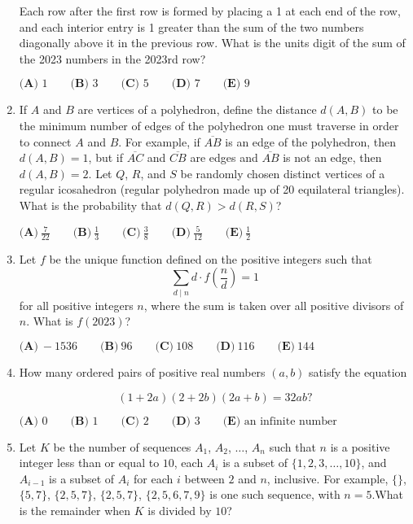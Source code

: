 \documentclass{article}
\begin{document}
\begin{enumerate}[label=\arabic*., itemsep=0.5em]
Each row after the first row is formed by placing a 1 at each end of the row, and each interior entry is 1 greater than the sum of the two numbers diagonally above it in the previous row. What is the units digit of the sum of the 2023 numbers in the 2023rd row?

\(\textbf{(A) }1\qquad\textbf{(B) }3\qquad\textbf{(C) }5\qquad\textbf{(D) }7\qquad\textbf{(E) }9\)\par \vspace{0.5em}\item If \(A\) and \(B\) are vertices of a polyhedron, define the distance \(d(A, B)\) to be the minimum number of edges of the polyhedron one must traverse in order to connect \(A\) and \(B\). For example, if \(\overline{AB}\) is an edge of the polyhedron, then \(d(A, B) = 1\), but if \(\overline{AC}\) and \(\overline{CB}\) are edges and \(\overline{AB}\) is not an edge, then \(d(A, B) = 2\). Let \(Q\), \(R\), and \(S\) be randomly chosen distinct vertices of a regular icosahedron (regular polyhedron made up of 20 equilateral triangles). What is the probability that \(d(Q, R) > d(R, S)\)?

\(\textbf{(A)}~\frac{7}{22}\qquad\textbf{(B)}~\frac13\qquad\textbf{(C)}~\frac38\qquad\textbf{(D)}~\frac5{12}\qquad\textbf{(E)}~\frac12\)\par \vspace{0.5em}\item Let \(f\) be the unique function defined on the positive integers such that
\begin{equation*}
\sum_{d\mid n}d\cdot f\left(\frac{n}{d}\right)=1
\end{equation*}
for all positive integers \(n\), where the sum is taken over all positive divisors of \(n\). What is \(f(2023)\)?

\(\textbf{(A)}~-1536\qquad\textbf{(B)}~96\qquad\textbf{(C)}~108\qquad\textbf{(D)}~116\qquad\textbf{(E)}~144\)\par \vspace{0.5em}\item How many ordered pairs of positive real numbers \((a,b)\) satisfy the equation

\begin{equation*}
(1+2a)(2+2b)(2a+b) = 32ab?
\end{equation*}


\(\textbf{(A) }0\qquad\textbf{(B) }1\qquad\textbf{(C) }2\qquad\textbf{(D) }3\qquad\textbf{(E) }\text{an infinite number}\)\par \vspace{0.5em}\item Let \(K\) be the number of sequences \(A_1\), \(A_2\), \(\dots\), \(A_n\) such that \(n\) is a positive integer less than or equal to \(10\), each \(A_i\) is a subset of \(\{1, 2, 3, \dots, 10\}\), and \(A_{i-1}\) is a subset of \(A_i\) for each \(i\) between \(2\) and \(n\), inclusive. For example, \(\{\}\), \(\{5, 7\}\), \(\{2, 5, 7\}\), \(\{2, 5, 7\}\), \(\{2, 5, 6, 7, 9\}\) is one such sequence, with \(n = 5\).What is the remainder when \(K\) is divided by \(10\)?


\end{enumerate}
\end{document}
